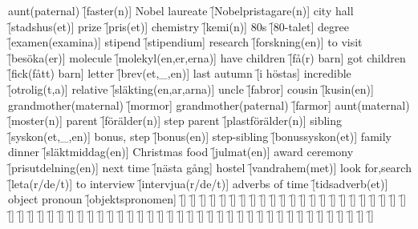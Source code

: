 \begin{questions}
    \begin{multicols}{2}
        \raggedcolumns
        \question aunt(paternal) \f[faster(n)]
        \question Nobel laureate \f[Nobelpristagare(n)]
        \question city hall \f[stadshus(et)]
        \question prize \f[pris(et)]
        \question chemistry \f[kemi(n)]
        \question 80s \f[80-talet]
        \question degree \f[examen(examina)]
        \question stipend \f[stipendium]
        \question research \f[forskning(en)]
        \question to visit \f[besöka(er)]
        \question molecule \f[molekyl(en,er,erna)]
        \question have children \f[få(r) barn]
        \question got children \f[fick(fått) barn]
        \question letter \f[brev(et,\_,en)]
        \question last autumn \f[i höstas]
        \question incredible \f[otrolig(t,a)]
        \question relative \f[släkting(en,ar,arna)]
        \question uncle \f[fabror]
        \question cousin \f[kusin(en)]
        \question grandmother(maternal) \f[mormor]
        \question grandmother(paternal) \f[farmor]
        \question aunt(maternal) \f[moster(n)]
        \question parent \f[förälder(n)]
        \question step parent \f[plastförälder(n)]
        \question sibling \f[syskon(et,\_,en)]
        \question bonus, step \f[bonus(en)]
        \question step-sibling \f[bonussyskon(et)]
        \question family dinner \f[släktmiddag(en)]
        \question Christmas food \f[julmat(en)]
        \question award ceremony \f[prisutdelning(en)]
        \question next time \f[nästa gång]
        \question hostel \f[vandrahem(met)]
        \question look for,search \f[leta(r/de/t)]
        \question to interview \f[intervjua(r/de/t)]
        \question adverbs of time \f[tidsadverb(et)]
        \question object pronoun \f[objektspronomen]
        \question  \f[]
        \question  \f[]
        \question  \f[]
        \question  \f[]
        \question  \f[]
        \question  \f[]
        \question  \f[]
        \question  \f[]
        \question  \f[]
        \question  \f[]
        \question  \f[]
        \question  \f[]
        \question  \f[]
        \question  \f[]
        \question  \f[]
        \question  \f[]
        \question  \f[]
        \question  \f[]
        \question  \f[]
        \question  \f[]
        \question  \f[]
        \question  \f[]
        \question  \f[]
        \question  \f[]
        \question  \f[]
        \question  \f[]
        \question  \f[]
        \question  \f[]
        \question  \f[]
        \question  \f[]
        \question  \f[]
        \question  \f[]
        \question  \f[]
        \question  \f[]
        \question  \f[]
        \question  \f[]
        \question  \f[]
        \question  \f[]
        \question  \f[]
        \question  \f[]
        \question  \f[]
        \question  \f[]
        \question  \f[]
        \question  \f[]
        \question  \f[]
        \question  \f[]
        \question  \f[]
        \question  \f[]
        \question  \f[]
        \question  \f[]
        \question  \f[]
        \question  \f[]
        \question  \f[]
        \question  \f[]
        \question  \f[]
        \question  \f[]
        \question  \f[]
        \question  \f[]
        \question  \f[]
        \question  \f[]
    \end{multicols}
\end{questions}
